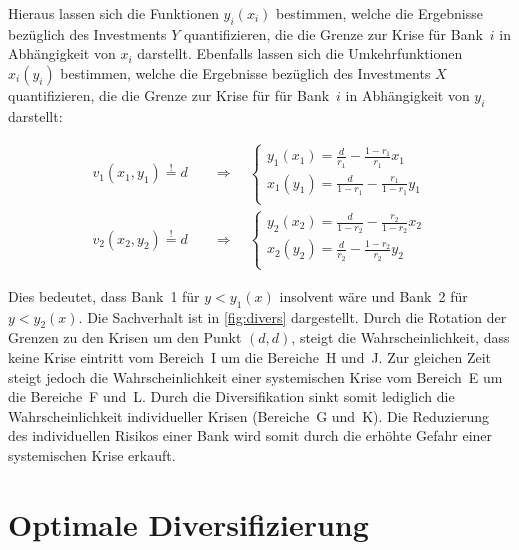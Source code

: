Hieraus lassen sich die Funktionen $y_i(x_i)$ bestimmen, welche die Ergebnisse bezüglich des Investments $Y$ quantifizieren, die die Grenze zur Krise für Bank~$i$ in Abhängigkeit von $x_i$ darstellt. Ebenfalls lassen sich die Umkehrfunktionen $x_i(y_i)$ bestimmen, welche die Ergebnisse bezüglich des Investments $X$ quantifizieren, die die Grenze zur Krise für für Bank~$i$ in Abhängigkeit von $y_i$ darstellt:

\begin{align}
	v_1(x_1,y_1) \overset{!}{=} d & \quad\Rightarrow\quad\begin{cases}
	                                                         y_1(x_1) = \displaystyle \frac{d}{r_1}   - \frac{1-r_1}{r_1} x_1   \\
	                                                         x_1(y_1) = \displaystyle \frac{d}{1-r_1} - \frac{r_1}{1-r_1} y_1   \\
	                                                     \end{cases} \label{eqn:div:boarder1}\\
	v_2(x_2,y_2) \overset{!}{=} d & \quad\Rightarrow\quad\begin{cases}
	                                                         y_2(x_2) = \displaystyle \frac{d}{1 - r_2} - \frac{r_2}{1-r_2} x_2 \\
	                                                         x_2(y_2) = \displaystyle \frac{d}{r_2}     - \frac{1-r_2}{r_2} y_2 \\
	                                                     \end{cases} \label{eqn:div:boarder2}
\end{align}

Dies bedeutet, dass Bank~1 für $y\!<\!y_1(x)$ insolvent wäre und Bank~2 für $y\!<\!y_2(x)$. Die Sachverhalt ist in \cref{fig:divers} dargestellt. Durch die Rotation der Grenzen zu den Krisen um den Punkt $(d,d)$, steigt die Wahrscheinlichkeit, dass keine Krise eintritt vom Bereich~I um die Bereiche~H und~J. Zur gleichen Zeit steigt jedoch die Wahrscheinlichkeit einer systemischen Krise vom Bereich~E um die Bereiche~F und~L. Durch die Diversifikation sinkt somit lediglich die Wahrscheinlichkeit individueller Krisen (Bereiche~G und~K). Die Reduzierung des individuellen Risikos einer Bank wird somit durch die erhöhte Gefahr einer systemischen Krise erkauft.

\section{Optimale Diversifizierung}%
\label{sec:div:opt}

